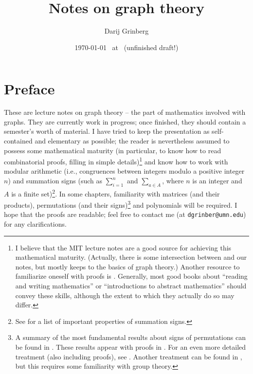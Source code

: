 \documentclass[numbers=enddot,12pt,final,onecolumn,notitlepage]{scrartcl}%
\theoremstyle{definition}
\let\sumnonlimits\sum
\renewcommand{\sum}{\sumnonlimits\limits}
\begin{document}
\title{Notes on graph theory}
\author{Darij Grinberg}
\date{
\today\ 
at \currenttime\ 
(unfinished draft!)}
\maketitle
\tableofcontents

\section{Preface}

These are lecture notes on graph theory -- the part of mathematics
involved with graphs. They are currently work in
progress; once finished, they should contain a semester's worth of
material. I have tried to keep the presentation as self-contained and
elementary as possible; the reader is nevertheless assumed to possess
some mathematical maturity (in particular, to know how to read
combinatorial proofs, filling in simple details)\footnote{I believe
that the MIT lecture notes \cite{LeLeMe16} are a good source for
achieving this mathematical maturity. (Actually, there is some
intersection between \cite[Chapter 12]{LeLeMe16} and our notes, but
\cite{LeLeMe16} mostly keeps to the basics of graph theory.)
Another resource to familiarize oneself with proofs is
\cite{Day-proofs}. Generally, most good books about ``reading and
writing mathematics'' or ``introductions to abstract mathematics''
should convey these skills, although the extent to which they actually
do so may differ.}
and know how to work
with modular arithmetic (i.e., congruences between integers modulo a
positive integer $n$) and summation signs (such as $\sum_{i=1}^n$ and
$\sum_{a \in A}$, where $n$ is an integer and $A$ is a finite
set)\footnote{See \cite[\S 1.3]{detnotes} for a list of important
properties of summation signs.}.
In some chapters, familiarity with matrices (and their products),
permutations (and their signs)\footnote{A summary of the most
fundamental results about signs of permutations can be found in
\cite[\S 8.1]{LaNaSc16}. These results appear with proofs in
\cite[Chapter 6.B]{Day-proofs}. For an even more detailed treatment
(also including proofs),
see \cite[\S 4.1--4.3]{detnotes}. Another treatment can be found in
\cite{Conrad-sign}, but this requires some familiarity with group
theory.}
and polynomials will be required.
I hope that the proofs are readable; feel free to contact me (at
\texttt{dgrinber@umn.edu}) for any clarifications.
\end{document}
